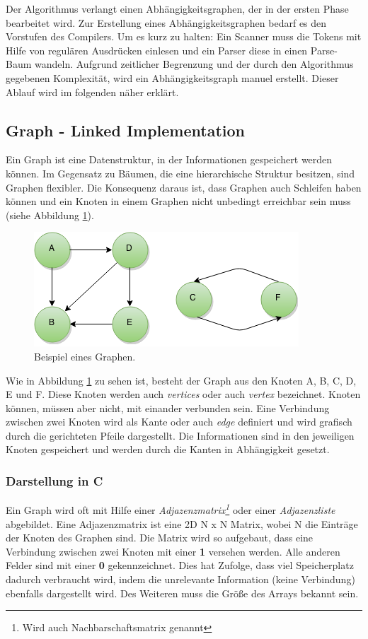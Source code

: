 Der Algorithmus verlangt einen Abhängigkeitsgraphen, der in der ersten Phase bearbeitet wird. Zur Erstellung eines Abhängigkeitsgraphen bedarf es den Vorstufen des Compilers. Um es kurz zu halten: Ein Scanner muss die Tokens mit Hilfe von regulären Ausdrücken einlesen und ein Parser diese in einen Parse-Baum wandeln. Aufgrund zeitlicher Begrenzung und der durch den Algorithmus gegebenen Komplexität, wird ein Abhängigkeitsgraph manuel erstellt. Dieser Ablauf wird im folgenden näher erklärt.

\subsection{Graph - Linked Implementation}\label{kap:graph} 
Ein Graph ist eine Datenstruktur, in der Informationen gespeichert werden können. Im Gegensatz zu Bäumen, die eine hierarchische Struktur besitzen, sind Graphen flexibler. Die Konsequenz daraus ist, dass Graphen auch Schleifen haben können und ein Knoten in einem Graphen nicht unbedingt erreichbar sein muss (siehe Abbildung \ref{fig:Graph}).
\begin{figure}[h]
	\centering
	\includegraphics[scale=0.5]{images/Graph.png} 
	\caption{Beispiel eines Graphen.}
	\label{fig:Graph}
\end{figure}
Wie in Abbildung \ref{fig:Graph} zu sehen ist, besteht der Graph aus den Knoten A, B, C, D, E und F. Diese Knoten werden auch \textit{vertices} oder auch \textit{vertex} bezeichnet. Knoten können, müssen aber nicht, mit einander verbunden sein. Eine Verbindung zwischen zwei Knoten wird als Kante oder auch \textit{edge} definiert und wird grafisch durch die gerichteten Pfeile dargestellt. Die Informationen sind in den jeweiligen Knoten gespeichert und werden durch die Kanten in Abhängigkeit gesetzt. 

\subsubsection*{Darstellung in C}
Ein Graph wird oft mit Hilfe einer \textit{Adjazenzmatrix\footnote{Wird auch Nachbarschaftsmatrix genannt}} oder einer \textit{Adjazenzliste} abgebildet. Eine Adjazenzmatrix ist eine 2D N x N Matrix, wobei N die Einträge der Knoten des Graphen sind. Die Matrix wird so aufgebaut, dass eine Verbindung zwischen zwei Knoten mit einer \textbf{1} versehen werden. Alle anderen Felder sind mit einer \textbf{0} gekennzeichnet. Dies hat Zufolge, dass viel Speicherplatz dadurch verbraucht wird, indem die unrelevante Information (keine Verbindung) ebenfalls dargestellt wird. Des Weiteren muss die Größe des Arrays bekannt sein. 

